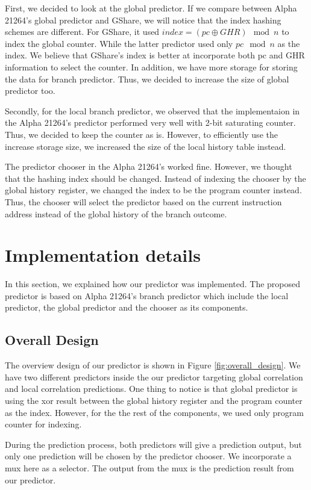 \documentclass[conference]{IEEEtran}
\begin{document}
First, we decided to look at the global predictor. If we compare between Alpha 21264's
global predictor and GShare, we will notice that the index hashing schemes are different.
For GShare, it used $index = (pc \oplus GHR) \mod{n}$ to index the global counter. While the latter
predictor used only $pc \mod{n}$ as the index. We believe that GShare's index is better
at incorporate both pc and GHR information to select the counter. In addition, we have more
storage for storing the data for branch predictor. Thus, we decided to increase the size of
global predictor too.

Secondly, for the local branch predictor, we observed that the implementaion in the
Alpha 21264's predictor performed very well with 2-bit saturating counter. Thus, we decided
to keep the counter as is. However, to efficiently use the increase storage size, we increased
the size of the local history table instead.

The predictor chooser in the Alpha 21264's worked fine. However, we thought that the hashing
index should be changed. Instead of indexing the chooser by the global history register,
we changed the index to be the program counter instead. Thus, the chooser will select the
predictor based on the current instruction address instead of the global
history of the branch outcome.

\section{Implementation details}

In this section, we explained how our predictor was implemented. The proposed predictor is
based on Alpha 21264's branch predictor which include the local predictor, the global predictor
and the chooser as its components.

\subsection{Overall Design}

The overview design of our predictor is shown in Figure \ref{fig:overall_design}. We have two different
predictors inside the our predictor targeting global correlation and local correlation predictions.
One thing to notice is that global predictor is using the xor result between the global history register
and the program counter as the index. However, for the the rest of the components, we used only program
counter for indexing.

During the prediction process, both predictors will give a prediction output, but only one prediction
will be chosen by the predictor chooser. We incorporate a mux here as a selector. The output from the mux
is the prediction result from our predictor.
\end{document}

